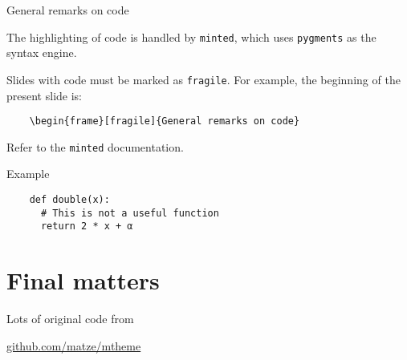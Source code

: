 \documentclass[9pt, compress, aspectratio=1610]{beamer}
\begin{document}
\begin{frame}[fragile]{General remarks on code}

  The highlighting of code is handled by \texttt{minted}, which uses
  \texttt{pygments} as the syntax engine.

  Slides with code \alert{must} be marked as \texttt{fragile}. For example, the
  beginning of the present slide is:

  \begin{verbatim}
    \begin{frame}[fragile]{General remarks on code}
  \end{verbatim}

  Refer to the \texttt{minted} documentation.

\end{frame}

\begin{frame}[t,fragile]{Example}
  \begin{verbatim}
    def double(x):
      # This is not a useful function
      return 2 * x + α
  \end{verbatim}
\end{frame}

\section{Final matters}

\begin{frame}{Lots of original code from}

  \begin{center}\url{github.com/matze/mtheme}\end{center}

\end{frame}
\end{document}
